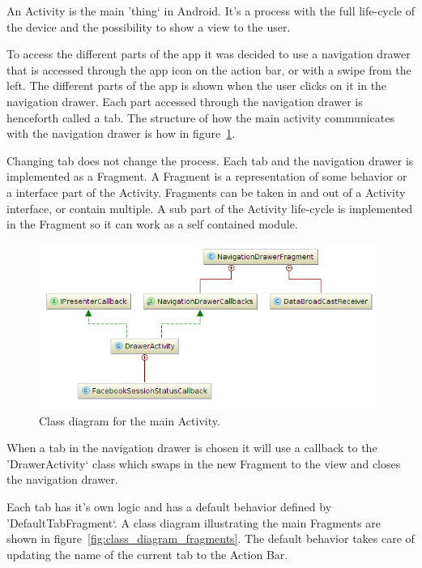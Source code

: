 An Activity is the main 'thing` in Android. It's a process with the full life-cycle of the device and the possibility to show a view to the user.

To access the different parts of the app it was decided to use a navigation drawer that is accessed through the app icon on the action bar, or with a swipe from the left. The different parts of the app is shown when the user clicks on it in the navigation drawer. Each part accessed through the navigation drawer is henceforth called a tab. The structure of how the main activity communicates with the navigation drawer is how in figure~\ref{fig:class_diagram_drawer}.

Changing tab does not change the process. Each tab and the navigation drawer is implemented as a Fragment. A Fragment is a representation of some behavior or a interface part of the Activity. Fragments can be taken in and out of a Activity interface, or contain multiple. A sub part of the Activity life-cycle is implemented in the Fragment so it can work as a self contained module. 

\begin{figure}[H]
\includegraphics[width=\textwidth]{ch/architecture/fig/class_diagram_drawer.png}
\caption{Class diagram for the main Activity.}
\label{fig:class_diagram_drawer}
\end{figure}

When a tab in the navigation drawer is chosen it will use a callback to the 'DrawerActivity` class which swaps in the new Fragment to the view and closes the navigation drawer.

Each tab has it's own logic and has a default behavior defined by 'DefaultTabFragment`. A class diagram illustrating the main Fragments are shown in figure~\ref{fig:class_diagram_fragments}. The default behavior takes care of updating the name of the current tab to the Action Bar.

